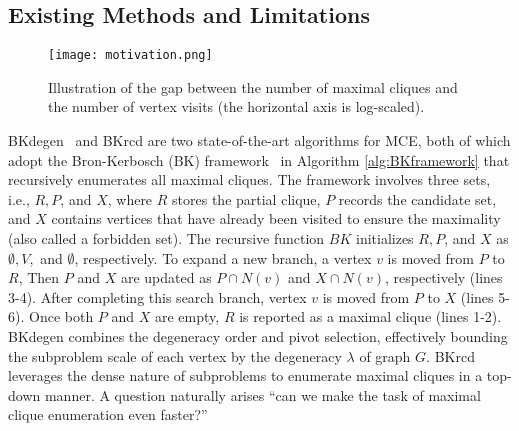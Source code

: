 \documentclass[sigconf, nonacm]{acmart}
\begin{document}
\subsection{Existing Methods and Limitations}

\begin{figure}[tbp]
\centerline{\texttt{[image: motivation.png]}}
\vspace{-0.15in}
\caption{Illustration of the gap between the number of maximal cliques and the number of vertex visits (the horizontal axis is log-scaled).}
\label{fig_motivation}
\vspace{-0.15in}
\end{figure}

\begin{algorithm}[b]
    \caption{$BK(R,P,X$)}
    \label{alg:BKframework}
    \small
    \nl {}
    \nl {}
\end{algorithm}


BKdegen~\cite{eppstein2010listing} and BKrcd \cite{li2019fast} are two state-of-the-art algorithms for MCE, both of which adopt the Bron-Kerbosch (BK) 
framework~\cite{bk1973} in Algorithm \ref{alg:BKframework} that recursively enumerates all maximal cliques. The framework involves three sets, i.e., $R, P$, and $X$, where $R$ stores the partial clique, $P$ records the candidate set, and $X$ contains vertices that have already been visited to ensure the maximality (also called a forbidden set). 
The recursive function {$BK$} initializes $R,P$, and $X$ as $\emptyset, V,$ and $ \emptyset$, respectively. To expand a new branch, a vertex $v$ is moved from $P$ to $R$, Then $P$ and $X$ are updated as $P \cap N(v)$ and $X \cap N(v)$, respectively (lines 3-4). After completing this search branch, vertex $v$ is moved from $P$ to $X$ (lines 5-6). Once both $P$ and $X$ are empty, $R$ is reported as a maximal clique (lines 1-2).
BKdegen \cite{eppstein2010listing} combines the degeneracy order and pivot selection, effectively bounding the subproblem scale of each vertex by the degeneracy $\lambda$ of graph $G$. 
BKrcd \cite{li2019fast} leverages the dense nature of subproblems to enumerate maximal cliques in a top-down manner. 
A  question naturally arises ``can we make the task of maximal clique enumeration even faster?''
\end{document}

